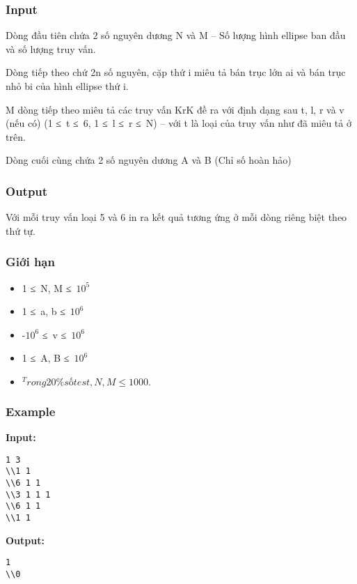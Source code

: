 \subsubsection{   Input  }

   Dòng đầu tiên chứa 2 số nguyên dương N và M – Số lượng hình ellipse ban đầu và số lượng truy vấn.  

   Dòng tiếp theo chứ 2n số nguyên, cặp thứ i miêu tả bán trục lớn ai và bán trục nhỏ bi của hình ellipse thứ i.  

   M dòng tiếp theo miêu tả các truy vấn KrK đề ra với định dạng sau t, l, r và v (nếu có) (1 ≤ t ≤ 6, 1 ≤ l ≤ r ≤ N) – với t là loại của truy vấn như đã miêu tả ở trên.  

   Dòng cuối cùng chứa 2 số nguyên dương A và B (Chỉ số hoàn hảo)  

\subsubsection{   Output  }

   Với mỗi truy vấn loại 5 và 6 in ra kết quả tương ứng ở mỗi dòng riêng biệt theo thứ tự.  

\subsubsection{   Giới hạn  }


\begin{itemize}
	\item     1 ≤ N, M ≤ $10^{5}$
	\item     1 ≤ a, b ≤ $10^{6}$
	\item     -$10^{6}$    ≤ v ≤ $10^{6}$
	\item     1 ≤ A, B ≤ $10^{6}$
	\item $^     Trong 20\% số test, N, M ≤ 1000.    $
\end{itemize}



\subsubsection{   Example  }

\textbf{    Input:   }
\begin{verbatim}
1 3
\\1 1
\\6 1 1 
\\3 1 1 1 
\\6 1 1
\\1 1\end{verbatim}

\textbf{    Output:   }
\begin{verbatim}
1
\\0\end{verbatim}
